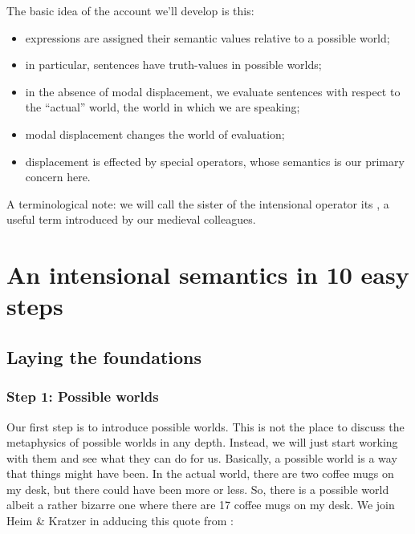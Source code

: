 The basic idea of the account we'll develop is this:

\begin{itemize}
\item expressions are assigned their semantic values relative to a possible
  world;
\item in particular, sentences have truth-values in possible worlds;
\item in the absence of modal displacement, we evaluate sentences with respect
  to the ``actual'' world, the world in which we are speaking;
\item modal displacement changes the world of evaluation;
\item displacement is effected by special operators, whose semantics is our
  primary concern here.
\end{itemize}
%
A terminological note: we will call the sister of the intensional operator its
, a useful term introduced by our medieval colleagues.

\section{An intensional semantics in 10 easy steps}\label{sec:10-steps}

\subsection{Laying the foundations} \label{sec:laying-foundations}

\subsubsection{Step 1: Possible worlds} \label{sec:world-parameter}

Our first step is to introduce possible worlds. This is not the place to discuss
the metaphysics of possible worlds in any depth. Instead, we will just start
working with them and see what they can do for us. Basically, a possible world
is a way that things might have been. In the actual world, there are two coffee
mugs on my desk, but there could have been more or less. So, there is a possible
world \dash albeit a rather bizarre one \dash where there are 17 coffee mugs on
my desk. We join Heim \& Kratzer in adducing this quote from
\citet[1f.]{lewis-1986-plurality-worlds}:

